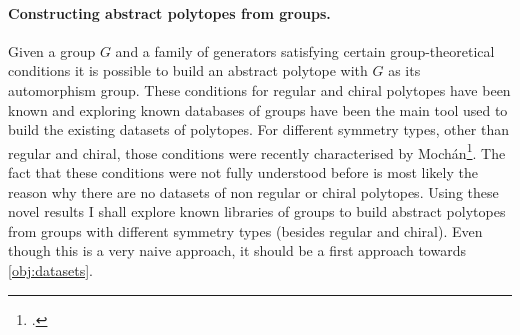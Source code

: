 


\paragraph{Constructing abstract polytopes from groups.}
Given a group $G$ and a family of generators satisfying certain group-theoretical conditions it is possible to build an abstract polytope with $G$ as its automorphism group.
These conditions for regular and chiral polytopes have been known and exploring known databases of groups have been the main tool used to build the existing datasets of polytopes.
For different symmetry types, other than regular and chiral, those conditions were recently characterised by Mochán\footcite{Mochan_2021_AbstractPolytopesTheir_PhDThesis}. The fact that these conditions were not fully understood before is most likely the reason why there are no datasets of non regular or chiral polytopes.
Using these novel results I shall explore known libraries of groups to build abstract polytopes from groups with different symmetry types (besides regular and chiral).
Even though this is a very naive approach, it should be a first approach towards \cref{obj:datasets}.



